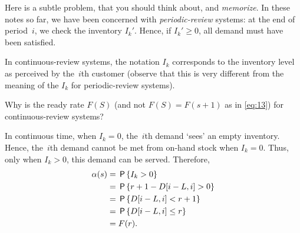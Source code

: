 \documentclass[stochastic-or.tex]{subfiles}
\begin{document}
\begin{exercise}
Here is a subtle problem, that you should think about, and \emph{memorize}.
In these notes so far, we have been concerned with \emph{periodic-review} systems: at the end of period~$i$, we check the inventory $I_k'$.
Hence, if $I_k'\geq 0$, all demand must have been satisfied.

  In continuous-review systems,  the notation $I_k$ corresponds to the inventory level as perceived by the~$i$th customer (observe that this is very different from the meaning of the $I_k$ for periodic-review systems).

  Why is the ready rate $F(S)$ (and not $F(S)=F(s+1)$ as in \cref{eq:13}) for continuous-review systems?
  \begin{solution}
    In continuous time, when $I_k=0$, the~$i$th demand `sees' an empty inventory. Hence, the~$i$th demand cannot be met from on-hand stock when $I_k=0$. Thus, only when $I_k>0$, this demand can be served. Therefore,
\begin{align*}
   \alpha(s) &= \,\mathsf{P}\left\{I_k > 0\right\} \\
   &= \,\mathsf{P}\left\{r+1 - D[i-L, i] > 0\right\} \\
   &= \,\mathsf{P}\left\{D[i-L, i] <  r+1\right\} \\
   &= \,\mathsf{P}\left\{D[i-L, i] \leq  r\right\} \\
   & = F(r).
\end{align*}
  \end{solution}
\end{exercise}


\end{document}
